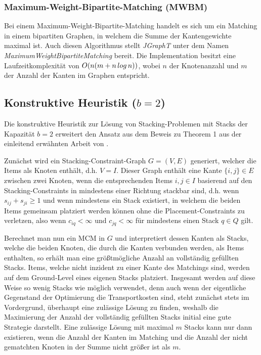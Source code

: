 \subsubsection{Maximum-Weight-Bipartite-Matching (MWBM)}
\label{sec:digression_mwbm}

Bei einem Maximum-Weight-Bipartite-Matching handelt es sich um ein Matching in einem bipartiten Graphen,
in welchem die Summe der Kantengewichte maximal ist. Auch diesen Algorithmus stellt \textit{JGraphT} \cite{JGraphT}
unter dem Namen \textit{MaximumWeightBipartiteMatching} bereit.
Die Implementation besitzt eine Laufzeitkomplexität von $O(n (m + n \thinspace log \thinspace n))$, wobei $n$ der Knotenanzahl
und $m$ der Anzahl der Kanten im Graphen entspricht.

\subsection{Konstruktive Heuristik ($b = 2$)}
\label{sec:two_cap_heuristic}

Die konstruktive Heuristik zur Lösung von Stacking-Problemen mit Stacks der Kapazität $b=2$ erweitert den Ansatz aus dem Beweis
zu Theorem 1 aus der einleitend erwähnten Arbeit von \citet{Bruns2015}.

Zunächst wird ein Stacking-Constraint-Graph $G = (V, E)$ generiert, welcher die Items als Knoten enthält, d.h. $V = I$. Dieser Graph
enthält eine Kante $\{i, j\} \in E$ zwischen zwei Knoten, wenn die entsprechenden Items $i, j \in I$ basierend auf den Stacking-Constraints
in mindestens einer Richtung stackbar sind, d.h. wenn $s_{ij} + s_{ji} \geq 1$ und wenn mindestens ein Stack existiert, in welchem die beiden Items gemeinsam platziert werden können ohne die Placement-Constraints zu verletzen, also wenn $c_{iq} < \infty$ und $c_{jq} < \infty$ für
mindestens einen Stack $q \in Q$ gilt.

Berechnet man nun ein \textsc{MCM} in $G$ und interpretiert dessen Kanten als Stacks, welche die beiden Knoten, die durch
die Kanten verbunden werden, als Items enthalten, so erhält man eine größtmögliche Anzahl an vollständig gefüllten Stacks.
Items, welche nicht inzident zu einer Kante des Matchings sind, werden auf dem Ground-Level eines eigenen Stacks platziert.
Insgesamt werden auf diese Weise so wenig Stacks wie möglich verwendet, denn auch wenn der eigentliche Gegenstand der Optimierung die Transportkosten sind, steht zunächst stets im Vordergrund, überhaupt eine zulässige Lösung zu finden, weshalb die Maximierung der Anzahl der vollständig gefüllten Stacks initial eine gute Strategie darstellt.
Eine zulässige Lösung mit maximal $m$ Stacks kann nur dann existieren, wenn die Anzahl der Kanten im Matching und die Anzahl der nicht gematchten Knoten in der Summe nicht größer ist als $m$.

